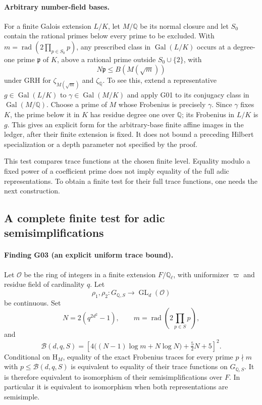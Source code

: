 \paragraph{Arbitrary number-field bases.}
For a finite Galois extension $L/K$, let $M/\mathbb Q$ be its normal closure and let $S_0$ contain the rational primes below every prime to be excluded.  With $m=\operatorname{rad}(2\prod_{p\in S_0}p)$, any prescribed class in $\operatorname{Gal}(L/K)$ occurs at a degree-one prime $\mathfrak p$ of $K$, above a rational prime outside $S_0\cup\{2\}$, with
\[
 N\mathfrak p\le B(M(\sqrt m))
\]
under GRH for $\zeta_{M(\sqrt m)}$ and $\zeta_{\mathbb Q}$.  To see this, extend a representative $g\in\operatorname{Gal}(L/K)$ to $\gamma\in\operatorname{Gal}(M/K)$ and apply G01 to its conjugacy class in $\operatorname{Gal}(M/\mathbb Q)$.  Choose a prime of $M$ whose Frobenius is precisely $\gamma$.  Since $\gamma$ fixes $K$, the prime below it in $K$ has residue degree one over $\mathbb Q$; its Frobenius in $L/K$ is $g$.  This gives an explicit form for the arbitrary-base finite affine images in the ledger, after their finite extension is fixed.  It does not bound a preceding Hilbert specialization or a depth parameter not specified by the proof.

This test compares trace functions at the chosen finite level.  Equality modulo a fixed power of a coefficient prime does not imply equality of the full adic representations.  To obtain a finite test for their full trace functions, one needs the next construction.

\subsection{A complete finite test for adic semisimplifications}

\paragraph{Finding G03 (an explicit uniform trace bound).}
Let $\mathcal O$ be the ring of integers in a finite extension $F/\mathbb Q_\ell$, with uniformizer $\varpi$ and residue field of cardinality $q$.  Let
\[
 \rho_1,\rho_2:G_{\mathbb Q,S}\longrightarrow\operatorname{GL}_d(\mathcal O)
\]
be continuous.  Set
\[
 N=2(q^{2d^2}-1),\qquad
 m=\operatorname{rad}\!\left(2\prod_{p\in S}p\right),
\]
and
\[
 \mathcal B(d,q,S)=
 \left[4\bigl((N-1)\log m+N\log N\bigr)+\tfrac52 N+5\right]^2.
 \tag{G03.1}
\]
Conditional on $\mathrm{H}_M$, equality of the exact Frobenius traces for every prime $p\nmid m$ with $p\le\mathcal B(d,q,S)$ is equivalent to equality of their trace functions on $G_{\mathbb Q,S}$.  It is therefore equivalent to isomorphism of their semisimplifications over $F$.  In particular it is equivalent to isomorphism when both representations are semisimple.

